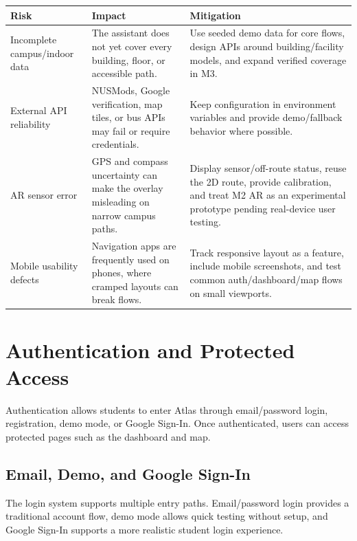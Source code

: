 \documentclass[11pt]{article}
\begin{document}
\begin{center}
\renewcommand{\arraystretch}{1.35}
\begin{tabularx}{\textwidth}{|L{0.24\textwidth}|L{0.28\textwidth}|X|}
\hline
\textbf{Risk} & \textbf{Impact} & \textbf{Mitigation} \\
\hline
Incomplete campus/indoor data & The assistant does not yet cover every building, floor, or accessible path. & Use seeded demo data for core flows, design APIs around building/facility models, and expand verified coverage in M3. \\
\hline
External API reliability & NUSMods, Google verification, map tiles, or bus APIs may fail or require credentials. & Keep configuration in environment variables and provide demo/fallback behavior where possible. \\
\hline
AR sensor error & GPS and compass uncertainty can make the overlay misleading on narrow campus paths. & Display sensor/off-route status, reuse the 2D route, provide calibration, and treat M2 AR as an experimental prototype pending real-device user testing. \\
\hline
Mobile usability defects & Navigation apps are frequently used on phones, where cramped layouts can break flows. & Track responsive layout as a feature, include mobile screenshots, and test common auth/dashboard/map flows on small viewports. \\
\hline
\end{tabularx}
\end{center}

\newpage

\section*{Authentication and Protected Access}

Authentication allows students to enter Atlas through email/password login, registration, demo mode, or Google Sign-In. Once authenticated, users can access protected pages such as the dashboard and map.

\subsection*{Email, Demo, and Google Sign-In}

The login system supports multiple entry paths. Email/password login provides a traditional account flow, demo mode allows quick testing without setup, and Google Sign-In supports a more realistic student login experience.
\end{document}
